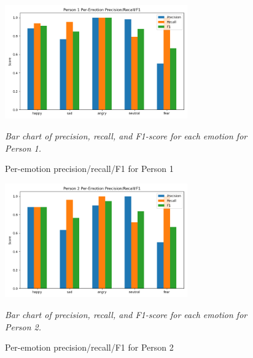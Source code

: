 \documentclass[12pt]{article}
\begin{document}
\begin{figure}[h!]
    \centering
    \includegraphics[width=0.7\textwidth]{model_analysis/Person 1_prf_bars.png}
    \caption{Per-emotion precision/recall/F1 for Person 1}
    \textit{Bar chart of precision, recall, and F1-score for each emotion for Person 1.}
\end{figure}
\begin{figure}[h!]
    \centering
    \includegraphics[width=0.7\textwidth]{model_analysis/Person 2_prf_bars.png}
    \caption{Per-emotion precision/recall/F1 for Person 2}
    \textit{Bar chart of precision, recall, and F1-score for each emotion for Person 2.}
\end{figure}
\end{document}
